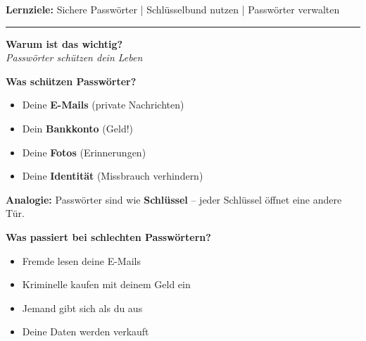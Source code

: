 \documentclass[a4paper,landscape,8pt]{extarticle}
\begin{document}

 \hfill
{\footnotesize\textbf{Lernziele:} Sichere Passwörter | Schlüsselbund nutzen | Passwörter verwalten}

\vspace{1mm}
\hrule
\vspace{1mm}

\begin{minipage}[t]{0.32\linewidth}
\begin{center}
\colorbox{warnred!10}{%
\begin{minipage}{0.95\linewidth}
\vspace{2mm}
\begin{center}
{\Large\bfseries\textcolor{warnred}{Warum ist das wichtig?}}\\[1pt]
{\footnotesize\itshape Passwörter schützen dein Leben}
\end{center}
\vspace{2mm}
\end{minipage}%
}
\end{center}

\vspace{1mm}

\textbf{Was schützen Passwörter?}
\begin{itemize}
\item Deine \textbf{E-Mails} (private Nachrichten)
\item Dein \textbf{Bankkonto} (Geld!)
\item Deine \textbf{Fotos} (Erinnerungen)
\item Deine \textbf{Identität} (Missbrauch verhindern)
\end{itemize}

\textbf{Analogie:} Passwörter sind wie \textbf{Schlüssel} -- jeder Schlüssel öffnet eine andere Tür.

\vspace{2mm}

\textbf{Was passiert bei schlechten Passwörtern?}
\begin{itemize}
\item Fremde lesen deine E-Mails
\item Kriminelle kaufen mit deinem Geld ein
\item Jemand gibt sich als du aus
\item Deine Daten werden verkauft
\end{itemize}


\end{minipage}
\end{document}
